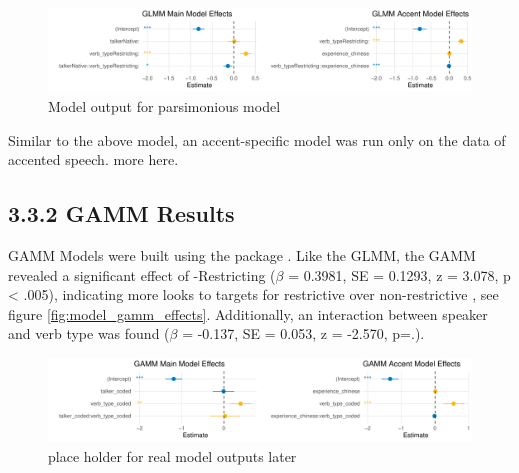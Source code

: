 \begin{figure}[H]
    \centering
    \includegraphics[width=\textwidth]{figures/GLMM_cow_model.pdf}
    \caption{Model output for parsimonious model}
    \label{fig:GLMER_base_model}
\end{figure}
 Similar to the above model, an accent-specific model was run only on the data of accented speech. more here.


\subsection{3.3.2 GAMM Results}

GAMM Models were built using the  package \parencite{mgcv_wood_2017}.
Like the GLMM, the GAMM revealed a significant effect of -Restricting ($\beta$ = 0.3981, SE = 0.1293, z = 3.078, p < .005), indicating more looks to targets for restrictive  over non-restrictive , see figure \ref{fig:model_gamm_effects}. Additionally, an interaction between speaker and verb type was found ($\beta$ = -0.137, SE = 0.053, z = -2.570, p=.). 

\begin{figure}[H]
    \centering
    \includegraphics[width=\textwidth]{figures/GAMM_cow_model.pdf}
    \caption{place holder for real model outputs later}
    \label{fig:GLMER_accent_model}
\end{figure}
